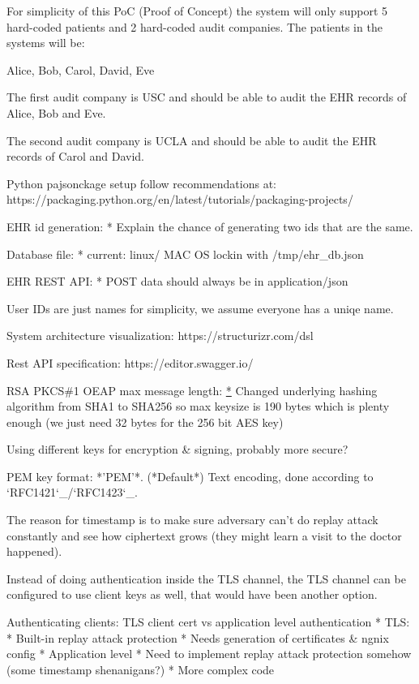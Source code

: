 \documentclass[11pt]{article}
\begin{document}
\begin{flushleft}
For simplicity of this PoC (Proof of Concept) the system will only support 5 hard-coded patients and 2 hard-coded audit companies. The patients in the systems will be:

Alice, Bob, Carol, David, Eve

The first audit company is USC and should be able to audit the EHR records of Alice, Bob and Eve.

The second audit company is UCLA and should be able to audit the EHR records of Carol and David.

Python pajsonckage setup follow recommendations at: https://packaging.python.org/en/latest/tutorials/packaging-projects/

EHR id generation:
* Explain the chance of generating two ids that are the same.

Database file:
* current: linux/ MAC OS lockin with /tmp/ehr_db.json

EHR REST API:
* POST data should always be in application/json

User IDs are just names for simplicity, we assume everyone has a uniqe name.

System architecture visualization: https://structurizr.com/dsl

Rest API specification: https://editor.swagger.io/

RSA PKCS\#1 OEAP max message length: \href{https://datatracker.ietf.org/doc/html/rfc8017#section-7.1}
	* Changed underlying hashing algorithm from SHA1 to SHA256 so max keysize is 190 bytes which is plenty enough (we just need 32 bytes for the 256 bit AES key)

Using different keys for encryption \& signing, probably more secure?

PEM key format:
*'PEM'*. (*Default*) Text encoding, done according to `RFC1421`_/`RFC1423`_.

The reason for timestamp is to make sure adversary can't do replay attack constantly and see how ciphertext grows (they might learn a visit to the doctor happened).

Instead of doing authentication inside the TLS channel, the TLS channel can be configured to use client keys as well, that would have been another option.

Authenticating clients: TLS client cert vs application level authentication
* TLS:
	* Built-in replay attack protection
	* Needs generation of certificates \& ngnix config
* Application level
	* Need to implement replay attack protection somehow (some timestamp shenanigans?)
	* More complex code


\end{flushleft}
\end{document}
